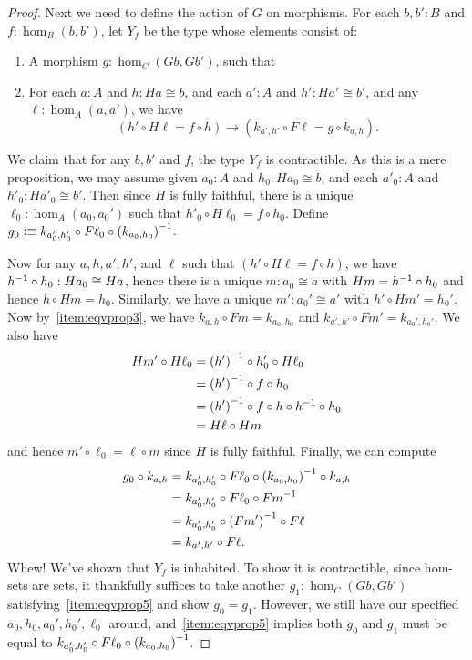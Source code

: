 \begin{proof}
  Next we need to define the action of $G$ on morphisms.
  For each $b,b':B$ and $f:\hom_B(b,b')$, let $Y_f$ be the type whose elements consist of:
  \begin{enumerate}[resume]
  \item A morphism $g:\hom_C(Gb,Gb')$, such that
  \item For each $a:A$ and $h:Ha\cong b$, and each $a':A$ and $h':Ha'\cong b'$, and any $\ell:\hom_A(a,a')$, we have\label{item:eqvprop5}
    \[ (h' \circ H\ell = f \circ h)
    \to
    (k_{a',h'} \circ F\ell = g\circ k_{a,h}). \]
  \end{enumerate}
  We claim that for any $b,b'$ and $f$, the type $Y_f$ is contractible.
  As this is a mere proposition, we may assume given $a_0:A$ and $h_0:Ha_0\cong b$, and each $a'_0:A$ and $h'_0:Ha'_0\cong b'$.
  Then since $H$ is fully faithful, there is a unique $\ell_0:\hom_A(a_0,a_0')$ such that $h'_0 \circ H\ell_0 = f \circ h_0$.
  Define $g_0 \vcentcolon\equiv k_{a_0',h_0'} \circ F \ell_0 \circ {(k_{a_0,h_0})}^{-1}$.

  Now for any $a,h,a',h'$, and $\ell$ such that $(h' \circ H\ell = f \circ h)$, we have ${h}^{-1}\circ h_0:Ha_0\cong Ha$, hence there is a unique $m:a_0\cong a$ with $Hm = {h}^{-1}\circ h_0$ and hence $h\circ Hm = h_0$.
  Similarly, we have a unique $m':a_0'\cong a'$ with $h'\circ Hm' = h_0'$.
  Now by~\ref{item:eqvprop3}, we have $k_{a,h}\circ Fm = k_{a_0,h_0}$ and $k_{a',h'}\circ Fm' = k_{a_0',h_0'}$.
  We also have
  \begin{align*}
    Hm' \circ H\ell_0 
    &= {(h')}^{-1} \circ h_0' \circ H\ell_0\\
    &= {(h')}^{-1} \circ f \circ h_0\\
    &= {(h')}^{-1} \circ f \circ h \circ {h}^{-1} \circ h_0\\
    &= H\ell \circ Hm
  \end{align*}
  and hence $m'\circ \ell_0 = \ell\circ m$ since $H$ is fully faithful.
  Finally, we can compute
  \begin{align*}
    g_0 \circ k_{a,h}
    &= k_{a_0',h_0'} \circ F \ell_0 \circ {(k_{a_0,h_0})}^{-1} \circ k_{a,h}\\
    &= k_{a_0',h_0'} \circ F \ell_0 \circ {Fm}^{-1}\\
    &= k_{a_0',h_0'} \circ {(Fm')}^{-1} \circ F\ell\\
    &= k_{a',h'}\circ F\ell.
  \end{align*}
  Whew!  We've shown that $Y_f$ is inhabited.
  To show it is contractible, since hom-sets are sets, it thankfully suffices to take another $g_1:\hom_C(Gb,Gb')$ satisfying~\ref{item:eqvprop5} and show $g_0=g_1$.
  However, we still have our specified $a_0,h_0,a_0',h_0',\ell_0$ around, and~\ref{item:eqvprop5} implies both $g_0$ and $g_1$ must be equal to $k_{a_0',h_0'} \circ F \ell_0 \circ {(k_{a_0,h_0})}^{-1}$.


\end{proof}
